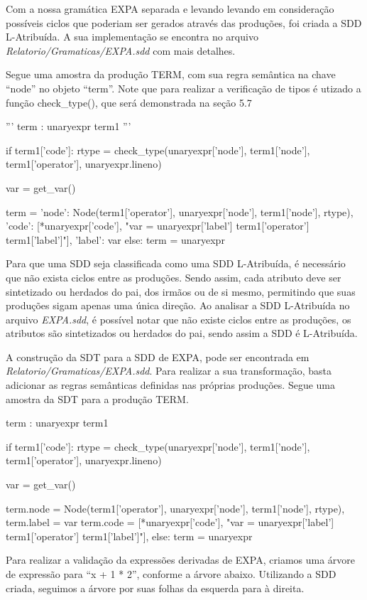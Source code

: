 \documentclass[
	12pt,				%
	openright,			%
	twoside,			%
	a4paper,			%
	english,			%
	french,				%
	spanish,			%
	brazil				%
	]{abntex2}
\begin{document}
Com a nossa gramática EXPA separada e levando
levando em consideração possíveis ciclos que poderiam ser gerados através das produções,
foi criada a SDD L-Atribuída. A sua implementação se encontra no arquivo \emph{Relatorio/Gramaticas/EXPA.sdd} com mais detalhes.

Segue uma amostra da produção TERM, com sua regra semântica na chave ``node'' no objeto ``term''.
Note que para realizar a verificação de tipos é utizado a função check\_type(), que será
demonstrada na seção 5.7

\begin{python}

'''
term : unaryexpr term1
'''

if term1['code']:
    rtype = check_type(unaryexpr['node'], term1['node'], term1['operator'], unaryexpr.lineno)

    var = get_var()


    term = {
        'node': Node(term1['operator'], unaryexpr['node'], term1['node'], rtype),
        'code': [*unaryexpr['code'], "{var} = {unaryexpr['label']} {term1['operator']} {term1['label']}"],
        'label': var
    } 
else:
    term = unaryexpr
\end{python}


Para que uma SDD seja classificada como uma SDD L-Atribuída,
é necessário que não exista ciclos entre as produções.
Sendo assim, cada atributo deve ser sintetizado ou herdados do pai,
dos irmãos ou de si mesmo, permitindo que suas produções sigam apenas uma
única direção. Ao analisar a SDD L-Atribuída no arquivo \emph{EXPA.sdd}, é possível notar
que não existe ciclos entre as produções, os atributos são sintetizados ou herdados do pai,
sendo assim a SDD é L-Atribuída.

A construção da SDT para a SDD de EXPA, pode ser encontrada em \emph{Relatorio/Gramaticas/EXPA.sdd}.
Para realizar a sua transformação, basta adicionar as regras semânticas definidas nas próprias produções.
Segue uma amostra da SDT para a produção TERM.

\begin{python}
term : unaryexpr term1 {
if term1['code']:
    rtype = check_type(unaryexpr['node'], term1['node'], term1['operator'], unaryexpr.lineno)

    var = get_var()

    term.node = Node(term1['operator'], unaryexpr['node'], term1['node'], rtype),
    term.label = var
    term.code = [*unaryexpr['code'], "{var} = {unaryexpr['label']} {term1['operator']} {term1['label']}"],
else:
    term = unaryexpr
}
\end{python}
Para realizar a validação da expressões derivadas de EXPA,
criamos uma árvore de expressão para ``x + 1 * 2'', conforme a árvore abaixo.
Utilizando a SDD criada, seguimos a árvore por suas folhas da esquerda para à direita.
\end{document}
